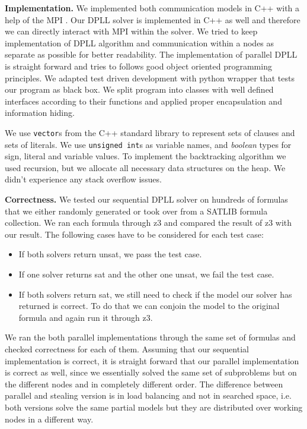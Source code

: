 \documentclass[letterpaper]{article}
\newcommand{\mypar}[1]{{\bf #1.}}
\begin{document}
\mypar{Implementation}
We implemented both communication models in C++ with a help of the MPI \cite{mpi}.
Our DPLL solver is implemented in C++ as well and therefore we can directly interact with MPI within the solver. We tried to keep implementation of DPLL algorithm and communication within a nodes as separate as possible for better readability.
The implementation of parallel DPLL is straight forward and tries to follows good object oriented programming principles. We adapted test driven development with python wrapper that tests our program as black box. We split program into classes with well defined interfaces according to their functions and applied proper encapsulation and information hiding. 

We use \texttt{vector}s from the C++ standard library to represent sets of clauses and sets of literals. We use \texttt{unsigned int}s as variable names, and \textit{boolean} types for sign, literal and variable values. 
To implement the backtracking algorithm we used recursion, but we allocate all necessary data structures on the heap.
We didn't experience any stack overflow issues.

\mypar{Correctness}
We tested our sequential DPLL solver on hundreds of formulas that we either randomly generated or took over from a SATLIB formula collection. \cite{cnf_website}
We ran each formula through z3 \cite{z3} and compared the result of z3 with our result.
The following cases have to be considered for each test case:
\begin{itemize}
    \item If both solvers return unsat, we pass the test case.
    \item If one solver returns sat and the other one unsat, we fail the test case.
    \item If both solvers return sat, we still need to check if the model our solver has returned is correct.
        To do that we can conjoin the model to the original formula and again run it through z3.
\end{itemize}

We ran the both parallel implementations through the same set of formulas and checked correctness for each of them.
Assuming that our sequential implementation is correct, it is straight forward that our parallel implementation is correct as well, since we essentially solved the same set of subproblems but on the different nodes and in completely different order. The difference between parallel and stealing version is in load balancing and not in searched space, i.e. both versions solve the same partial models but they are distributed over working nodes in a different way.
\end{document}
